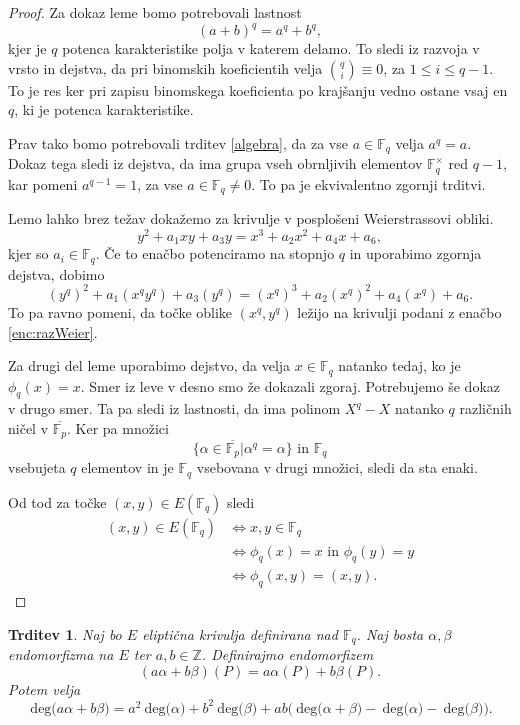 \documentclass[12pt,a4paper,twoside]{article}
\theoremstyle{definition} %
\theoremstyle{plain} %
\newtheorem{trditev}[definicija]{Trditev}
\numberwithin{equation}{section}  %
\newcommand{\Z}{\mathbb Z}
\newcommand{\F}{\mathbb F}
\newcommand{\Fq}[1]{{\mathbb{F}_{#1}}}
\newcommand{\E}[1]{E({#1})}
\newcommand{\DEG}[1]{\ \text{deg(}{#1}\text{)}}
\begin{document}
\begin{proof}
Za dokaz leme bomo potrebovali lastnost $$(a+b)^q = a^q+b^q,$$ kjer je $q$ potenca karakteristike polja v katerem delamo. To sledi iz razvoja v vrsto in dejstva, da pri binomskih koeficientih velja
${q\choose i} \equiv 0$, za $1 \leq i \leq q-1$. To je res ker pri zapisu binomskega koeficienta po krajšanju vedno ostane vsaj en $q$, ki je potenca karakteristike. 

Prav tako bomo potrebovali trditev \ref{algebra}, da za vse $a \in \F_q$ velja $a^q = a$. Dokaz tega sledi iz dejstva, da ima grupa vseh obrnljivih elementov $\F^{\times}_q$ red $q-1$, kar pomeni $a^{q-1} = 1$, za vse $a \in \F_q \neq 0$. To pa je ekvivalentno zgornji trditvi.

Lemo lahko brez težav dokažemo za krivulje v posplošeni Weierstrassovi obliki.
\begin{equation}
\label{enc:razWeier}
y^2+a_1xy+a_3y=x^3+a_2x^2+a_4x+a_6,
\end{equation}
kjer so $a_i \in \F_q$. Če to enačbo potenciramo na stopnjo $q$ in uporabimo zgornja dejstva, dobimo
$$(y^q)^2+a_1(x^qy^q)+a_3(y^q)=(x^q)^3+a_2(x^q)^2+a_4(x^q)+a_6.$$
To pa ravno pomeni, da točke oblike $(x^q,y^q)$ ležijo na krivulji podani z enačbo \ref{enc:razWeier}.

Za drugi del leme uporabimo dejstvo, da velja $x \in \F_q$ natanko tedaj, ko je $\phi_q(x) = x$. Smer iz leve v desno smo že dokazali zgoraj. Potrebujemo še dokaz v drugo smer. Ta pa sledi iz lastnosti, da ima polinom $X^q-X$ natanko $q$ različnih ničel v $\overline{\F_p}$. Ker pa množici
$$\{ \alpha \in \overline{\F_p} | \alpha^q = \alpha \} \text{ in } \F_q$$
vsebujeta $q$ elementov in je $\F_q$ vsebovana v drugi množici, sledi da sta enaki.

Od tod za točke $(x,y) \in \E{\Fq{q}}$ sledi
\begin{align}
(x,y) \in E(\F_q) &{}\Leftrightarrow x,y \in \F_q \nonumber \\
&{}  \Leftrightarrow \phi_q(x) = x \text{ in } \phi_q(y) = y  \nonumber \\
&{} \Leftrightarrow \phi_q(x,y) = (x,y). \nonumber
\end{align} 

\end{proof}

\begin{trditev}
\label{trd:3.16}
Naj bo $E$ eliptična krivulja definirana nad $\Fq{q}$.
Naj bosta $\alpha,\beta$ endomorfizma na $E$ ter $a,b \in \Z$. Definirajmo endomorfizem
$$(a\alpha+b\beta)(P) = a\alpha(P)+b\beta(P).$$
Potem velja
$$\DEG{a\alpha+b\beta} = a^2\DEG{\alpha}+b^2\DEG{\beta} + ab\text{(}\DEG{\alpha+\beta}-\DEG{\alpha}-\DEG{\beta}\text{)}.$$
\end{trditev}
\end{document}

